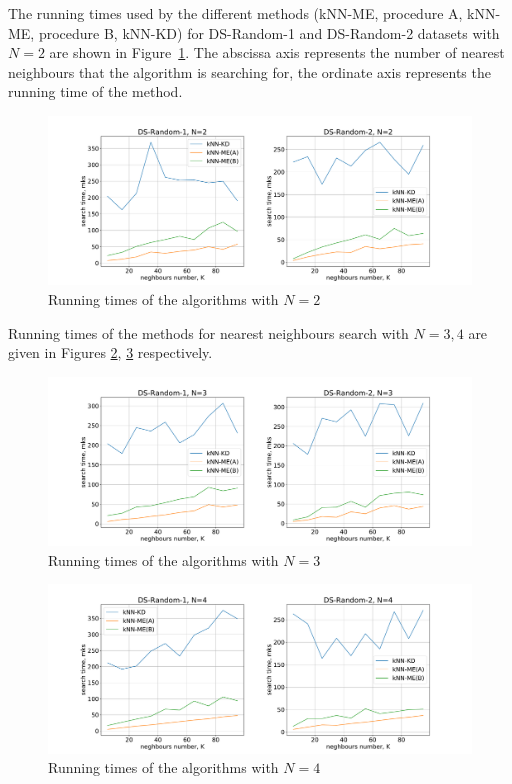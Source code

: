 \documentclass[entropy,article,submit,moreauthors,pdftex]{Definitions/mdpi}
\begin{document}
\begin{paracol}{2}
The running times used by the different methods (kNN-ME, procedure A, kNN-ME, procedure B, kNN-KD) for DS-Random-1 and DS-Random-2 datasets with $N = 2$ are shown in Figure~\ref{fig3}. The abscissa axis represents the number of nearest neighbours that the algorithm is searching for, the ordinate axis represents the running time of the method.

\begin{figure}
\widefigure
\includegraphics[width=1.0\linewidth]{fig3.pdf}
\caption{Running times of the algorithms with $N = 2$\label{fig3}}
\end{figure}  

Running times of the methods for nearest neighbours search with $N = 3, 4$ are given in Figures \ref{fig4}, \ref{fig5} respectively.

\begin{figure}
\widefigure
\includegraphics[width=1.0\linewidth]{fig4.pdf}
\caption{Running times of the algorithms with $N = 3$\label{fig4}}
\end{figure}  

\begin{figure}
\widefigure
\includegraphics[width=1.0\linewidth]{fig5.pdf}
\caption{Running times of the algorithms with $N = 4$\label{fig5}}
\end{figure}  


\end{paracol}
\end{document}
